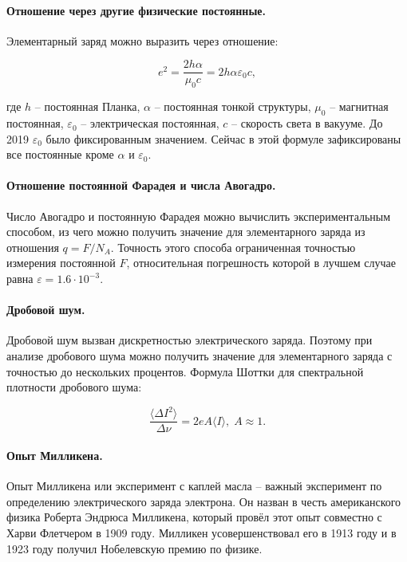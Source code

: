 \documentclass[a4paper,12pt]{article} %
\begin{document}
\paragraph{Отношение через другие физические постоянные.} Элементарный заряд можно выразить через отношение:

\[ e^2 = \frac{2h\alpha}{\mu_0 c} = 2 h \alpha \varepsilon_0 c,
\]

\noindent где $h$ -- постоянная Планка, $\alpha$ -- постоянная тонкой структуры, $\mu_0$ -- магнитная постоянная,  $\varepsilon_0$ -- электрическая постоянная, $c$ -- скорость света в вакууме. До 2019 $\varepsilon_0$ было фиксированным значением. Сейчас в этой формуле зафиксированы все постоянные кроме $\alpha$ и $\varepsilon_0$.

\paragraph{Отношение постоянной Фарадея и числа Авогадро.} Число Авогадро и постоянную Фарадея можно вычислить экспериментальным способом, из чего можно получить значение для элементарного заряда из отношения $q = F / N_A$. Точность этого способа ограниченная точностью измерения постоянной $F$, относительная погрешность которой в лучшем случае равна $\varepsilon = 1.6 \cdot 10^{-3}$.

\paragraph{Дробовой шум.} Дробовой шум вызван дискретностью электрического заряда. Поэтому при анализе дробового шума можно получить значение для элементарного заряда с точностью до нескольких процентов. Формула Шоттки для спектральной плотности дробового шума:

\[ \frac{\langle \Delta I^2 \rangle}{\Delta \nu} = 2e A \langle I \rangle,\; A \approx 1.
\]

\paragraph{Опыт Милликена.} Опыт Милликена или эксперимент с каплей масла -- важный эксперимент по определению электрического заряда электрона. Он назван в честь американского физика Роберта Эндрюса Милликена, который провёл этот опыт совместно с Харви Флетчером в 1909 году. Милликен усовершенствовал его в 1913 году и в 1923 году получил Нобелевскую премию по физике. 
\end{document}
